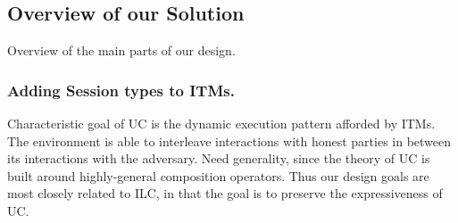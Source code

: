 \begin{theorem}[Composition]
%
%
%




\subsection{Overview of our Solution}
Overview of the main parts of our design.

    \subsubsection{Adding Session types to ITMs.}

    Characteristic goal of UC is the dynamic execution pattern afforded by ITMs. The environment is able to interleave interactions with honest parties in between its interactions with the adversary.
    Need generality, since the theory of UC is built around highly-general composition operators.
    Thus our design goals are most closely related to ILC, in that the goal is to preserve the expressiveness of UC.


\end{theorem}
